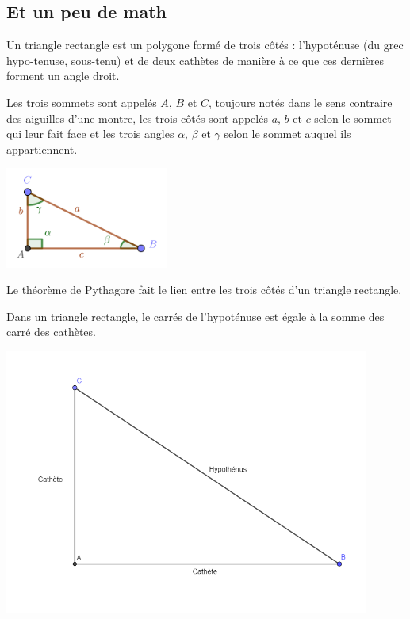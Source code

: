 \subsection{Et un peu de math}

\begin{definition}
Un triangle rectangle est un polygone formé de trois côtés : l'hypoténuse (du grec hypo-tenuse, sous-tenu) et de deux cathètes de manière à ce que ces dernières forment un angle droit. 
\end{definition}

\begin{notation}
Les trois sommets sont appelés $A$, $B$ et $C$, toujours notés dans le sens contraire des aiguilles d'une montre, les trois côtés sont appelés $a$, $b$ et $c$ selon le sommet qui leur fait face et les trois angles $\alpha $, $\beta $ et $\gamma $ selon le sommet auquel ils appartiennent.

\begin{center}
\includegraphics[width=0.4\textwidth]{triangle/image/triangle.png}
\end{center}
\end{notation}

Le théorème de Pythagore fait le lien entre les trois côtés d'un triangle rectangle.

\begin{theoreme}
Dans un triangle rectangle, le carrés de l'hypoténuse est égale à la somme des carré des cathètes.
\end{theoreme}

\begin{center}
\includegraphics[width=0.9\textwidth]{triangle/image/pythagore.png}
\end{center}

